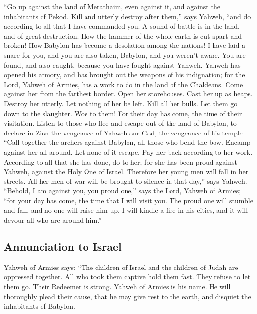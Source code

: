  ``Go up against the land of Merathaim, even against it,
and against the inhabitants of Pekod. Kill and utterly destroy after
them,'' says Yahweh, ``and do according to all that I have commanded
you.  A sound of battle is in the land, and of great
destruction.  How the hammer of the whole earth is cut
apart and broken! How Babylon has become a desolation among the nations!
 I have laid a snare for you, and you are also taken,
Babylon, and you weren't aware. You are found, and also caught, because
you have fought against Yahweh.  Yahweh has opened his
armory, and has brought out the weapons of his indignation; for the
Lord, Yahweh of Armies, has a work to do in the land of the Chaldeans.
 Come against her from the farthest border. Open her
storehouses. Cast her up as heaps. Destroy her utterly. Let nothing of
her be left.  Kill all her bulls. Let them go down to the
slaughter. Woe to them! For their day has come, the time of their
visitation.  Listen to those who flee and escape out of
the land of Babylon, to declare in Zion the vengeance of Yahweh our God,
the vengeance of his temple.  ``Call together the archers
against Babylon, all those who bend the bow. Encamp against her all
around. Let none of it escape. Pay her back according to her work.
According to all that she has done, do to her; for she has been proud
against Yahweh, against the Holy One of Israel. 
Therefore her young men will fall in her streets. All her men of war
will be brought to silence in that day,'' says Yahweh. 
``Behold, I am against you, you proud one,'' says the Lord, Yahweh of
Armies; ``for your day has come, the time that I will visit you.
 The proud one will stumble and fall, and no one will
raise him up. I will kindle a fire in his cities, and it will devour all
who are around him.''

\hypertarget{annunciation-to-israel}{%
\subsection{Annunciation to Israel}\label{annunciation-to-israel}}

 Yahweh of Armies says: ``The children of Israel and the
children of Judah are oppressed together. All who took them captive hold
them fast. They refuse to let them go.  Their Redeemer is
strong. Yahweh of Armies is his name. He will thoroughly plead their
cause, that he may give rest to the earth, and disquiet the inhabitants
of Babylon.

